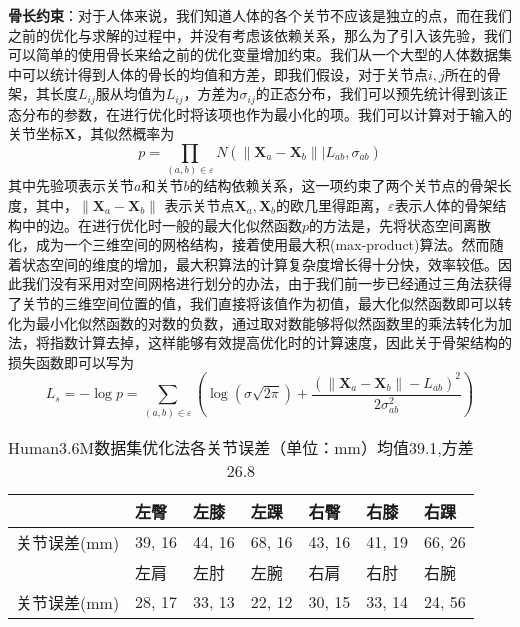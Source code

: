 \textbf{骨长约束}：对于人体来说，我们知道人体的各个关节不应该是独立的点，而在我们之前的优化与求解的过程中，并没有考虑该依赖关系，那么为了引入该先验，我们可以简单的使用骨长来给之前的优化变量增加约束。我们从一个大型的人体数据集中可以统计得到人体的骨长的均值和方差，即我们假设，对于关节点\(i,j\)所在的骨架，其长度\(L_{ij}\)服从均值为\(L_{ij}\)，方差为\(\sigma_{ij}\)的正态分布，我们可以预先统计得到该正态分布的参数，在进行优化时将该项也作为最小化的项。我们可以计算对于输入的关节坐标\(\bm{X}\)，其似然概率为
\begin{equation}
    p  = \prod _ { ( a,b ) \in \varepsilon } N \left( \left\| \boldsymbol {X} _ { a } - \boldsymbol {X} _ { b } \right\| | L _ {ab} , \sigma _ {ab} \right)
\end{equation}
其中先验项表示关节\(a\)和关节\(b\)的结构依赖关系，这一项约束了两个关节点的骨架长度，其中，\(\left\| \boldsymbol {X} _ { a } - \boldsymbol {X} _ { b } \right\|\) 表示关节点\(\boldsymbol {X} _ { a }, \boldsymbol {X} _ { b } \)的欧几里得距离，\(\varepsilon\)表示人体的骨架结构中的边。在进行优化时一般的最大化似然函数\(p\)的方法是，先将状态空间离散化，成为一个三维空间的网格结构，接着使用最大积(max-product)算法\cite{max-product}。然而随着状态空间的维度的增加，最大积算法的计算复杂度增长得十分快，效率较低。因此我们没有采用对空间网格进行划分的办法，由于我们前一步已经通过三角法获得了关节的三维空间位置的值，我们直接将该值作为初值，最大化似然函数即可以转化为最小化似然函数的对数的负数，通过取对数能够将似然函数里的乘法转化为加法，将指数计算去掉，这样能够有效提高优化时的计算速度，因此关于骨架结构的损失函数即可以写为
\begin{equation}
    L_{s} = -\log p = \sum_{ ( a,b ) \in \varepsilon }\left(\log (\sigma \sqrt{2\pi}) + \frac{(\left\| \boldsymbol {X} _ { a } - \boldsymbol {X} _ { b } \right\| - L_{ab})^2}{2\sigma_{ab}^2}\right)
\end{equation}

\begin{table}[H]
    \centering
    \begin{tabular}{lllllll}
        \hline
                     & 左臀  & 左膝  & 左踝  & 右臀  & 右膝  & 右踝  \\
        \hline
        关节误差(mm) & 39, 16 & 44, 16 & 68, 16 & 43, 16 & 41, 19 & 66, 26 \\
        \hline
                     & 左肩  & 左肘  & 左腕  & 右肩  & 右肘  & 右腕  \\
        关节误差(mm) & 28, 17 & 33, 13 & 22, 12 & 30, 15 & 33, 14 & 24, 56 \\
        \hline
    \end{tabular}
    \caption{Human3.6M数据集优化法各关节误差（单位：mm）均值39.1,方差26.8\label{tab:3derroropt}}
\end{table}

